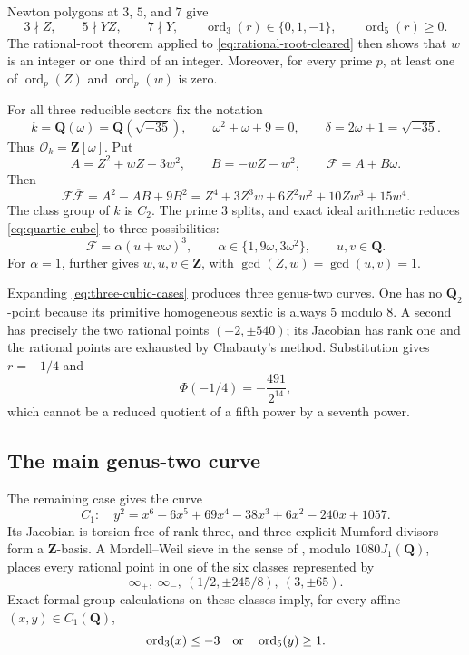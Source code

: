\documentclass[11pt]{article}
\newcommand{\Q}{\mathbf Q}
\newcommand{\Z}{\mathbf Z}
\newcommand{\OO}{\mathcal O}
\newcommand{\ord}{\operatorname{ord}}
\theoremstyle{definition}
\theoremstyle{remark}
\begin{document}
Newton polygons at $3$, $5$, and $7$ give
\begin{equation}\label{eq:rational-local}
 3\nmid Z,\qquad 5\nmid YZ,\qquad 7\nmid Y,\qquad
 \ord_3(r)\in\{0,1,-1\},\qquad \ord_5(r)\geq0.
\end{equation}
The rational-root theorem applied to \eqref{eq:rational-root-cleared}
then shows that $w$ is an integer or one third of an integer.  Moreover, for
every prime $p$, at least one of $\ord_p(Z)$ and $\ord_p(w)$ is zero.

For all three reducible sectors fix the notation
\begin{equation}\label{eq:k-minus35}
 k=\Q(\omega)=\Q(\sqrt{-35}),\qquad
 \omega^2+\omega+9=0,\qquad \delta=2\omega+1=\sqrt{-35}.
\end{equation}
Thus $\OO_k=\Z[\omega]$.  Put
\[
 A=Z^2+wZ-3w^2,\qquad B=-wZ-w^2,\qquad \mathcal F=A+B\omega.
\]
Then
\[
 \mathcal F\overline{\mathcal F}=A^2-AB+9B^2
        =Z^4+3Z^3w+6Z^2w^2+10Zw^3+15w^4.
\]
The class group of $k$ is $C_2$.  The prime $3$ splits, and exact ideal
arithmetic reduces \eqref{eq:quartic-cube} to three possibilities:
\begin{equation}\label{eq:three-cubic-cases}
 \mathcal F=\alpha(u+v\omega)^3,\qquad
               \alpha\in\{1,9\omega,3\omega^2\},\qquad u,v\in\Q.
\end{equation}
For $\alpha=1$, \cite[Lemma~6.4]{DahmenSiksek} further gives
$w,u,v\in\Z$, with $\gcd(Z,w)=\gcd(u,v)=1$.

Expanding \eqref{eq:three-cubic-cases} produces three genus-two curves.
One has no $\Q_2$-point because its primitive homogeneous sextic is always
$5$ modulo $8$.  A second has precisely the two rational points
$(-2,\pm540)$; its Jacobian has rank one and the rational points are
exhausted by Chabauty's method.  Substitution gives $r=-1/4$ and
\[
                         \Phi(-1/4)=-\frac{491}{2^{14}},
\]
which cannot be a reduced quotient of a fifth power by a seventh power.

\subsection{The main genus-two curve}

The remaining case gives the curve
\begin{equation}\label{eq:rational-genus2}
 C_1:\quad
 y^2=x^6-6x^5+69x^4-38x^3+6x^2-240x+1057.
\end{equation}
Its Jacobian is torsion-free of rank three, and three explicit Mumford
divisors form a $\Z$-basis.  A Mordell--Weil sieve in the sense of
\cite{BruinStollSieve}, modulo $1080J_1(\Q)$,
places every rational point in one of the six classes represented by
\[
 \infty_+,\ \infty_-,\ (1/2,\pm245/8),\ (3,\pm65).
\]
Exact formal-group calculations on these classes imply, for every affine
$(x,y)\in C_1(\Q)$,
\begin{equation}\label{eq:rational-local-alternative}
                         \ord_3(x)\leq-3
                    \quad\hbox{or}\quad
                         \ord_5(y)\geq1.
\end{equation}
\end{document}
